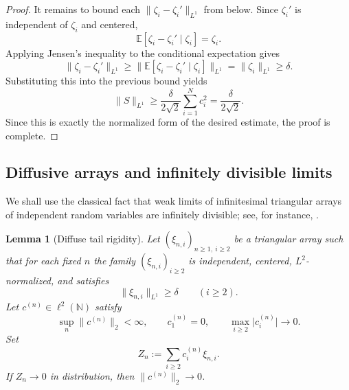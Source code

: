 \documentclass[11pt]{amsart}
\numberwithin{equation}{section}
\newtheorem{lemma}[theorem]{Lemma}
\theoremstyle{definition}
\theoremstyle{remark}
\newcommand{\E}{\mathbb E}
\newcommand{\N}{\mathbb N}
\newcommand{\abs}[1]{\lvert #1 \rvert}
\newcommand{\norm}[1]{\lVert #1 \rVert}
\begin{document}
\begin{proof}
It remains to bound each $\norm{\zeta_i-\zeta_i'}_{L^1}$ from below.  Since
$\zeta_i'$ is independent of $\zeta_i$ and centered,
\[
\E[\zeta_i-\zeta_i' \mid \zeta_i]
=\zeta_i.
\]
Applying Jensen's inequality to the conditional expectation gives
\[
\norm{\zeta_i-\zeta_i'}_{L^1}
\ge
\norm{\E[\zeta_i-\zeta_i' \mid \zeta_i]}_{L^1}
=\norm{\zeta_i}_{L^1}
\ge \delta.
\]
Substituting this into the previous bound yields
\[
\norm{S}_{L^1}
\ge
\frac{\delta}{2\sqrt2}\sum_{i=1}^N c_i^2
=\frac{\delta}{2\sqrt2}.
\]
Since this is exactly the normalized form of the desired estimate, the proof is
complete.
\end{proof}

\subsection{Diffusive arrays and infinitely divisible limits}

We shall use the classical fact that weak limits of infinitesimal triangular
arrays of independent random variables are infinitely divisible; see, for
instance, \cite[Chapter~IV]{gnedenko-kolmogorov}.

\begin{lemma}[Diffuse tail rigidity]\label{lem:tail-rigidity}
Let $(\xi_{n,i})_{n\ge1,\ i\ge2}$ be a triangular array such that for each
fixed $n$ the family $(\xi_{n,i})_{i\ge2}$ is independent, centered,
$L^2$-normalized, and satisfies
\[
\norm{\xi_{n,i}}_{L^1}\ge \delta
\qquad(i\ge2).
\]
Let $c^{(n)}\in \ell^2(\N)$ satisfy
\[
\sup_n \norm{c^{(n)}}_2<\infty,
\qquad
c_1^{(n)}=0,
\qquad
\max_{i\ge2}\abs{c_i^{(n)}}\to0.
\]
Set
\[
Z_n:=\sum_{i\ge2} c_i^{(n)}\xi_{n,i}.
\]
If $Z_n\to0$ in distribution, then $\norm{c^{(n)}}_2\to0$.
\end{lemma}
\end{document}
